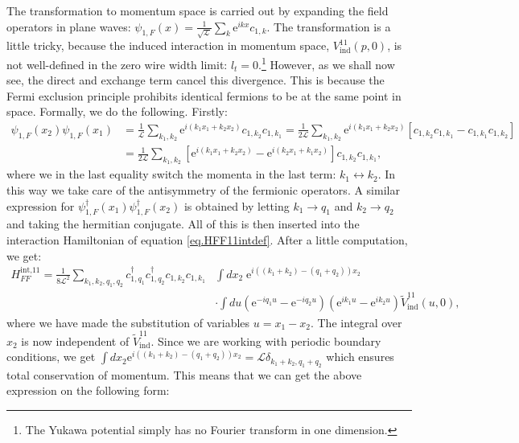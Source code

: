 The transformation to momentum space is carried out by expanding the field operators in plane waves: $\psi_{1,F}(x) = \frac{1}{\sqrt{\mathcal{L}}}\sum_k \text{e}^{ikx} c_{1,k}$. The transformation is a little tricky, because the induced interaction in momentum space, $V^{11}_{\text{ind}}(p, 0)$, is not well-defined in the zero wire width limit: $l_t = 0$.\footnote{The Yukawa potential simply has no Fourier transform in one dimension.} However, as we shall now see, the direct and exchange term cancel this divergence. This is because the Fermi exclusion principle prohibits identical fermions to be at the same point in space. Formally, we do the following. Firstly:
\begin{align}
\psi_{1,F}(x_2) \psi_{1,F}(x_1) &= \frac{1}{\mathcal{L}}\sum_{k_1,k_2} \text{e}^{i(k_1x_1 + k_2x_2)} c_{1, k_2}c_{1, k_1} = \frac{1}{2\mathcal{L}}\sum_{k_1,k_2} \text{e}^{i(k_1x_1 + k_2x_2)} \left[c_{1, k_2}c_{1, k_1} - c_{1, k_1}c_{1, k_2}\right] \nonumber \\
&= \frac{1}{2\mathcal{L}}\sum_{k_1,k_2} \left[\text{e}^{i(k_1x_1 + k_2x_2)} - \text{e}^{i(k_2x_1 + k_1x_2)}\right]c_{1, k_2}c_{1, k_1}, \nonumber
\end{align}
where we in the last equality switch the momenta in the last term: $k_1 \leftrightarrow k_2$. In this way we take care of the antisymmetry of the fermionic operators. A similar expression for $\psi^\dagger_{1, F}(x_1)\psi^\dagger_{1, F}(x_2)$ is obtained by letting $k_1 \to q_1$ and $k_2 \to q_2$ and taking the hermitian conjugate. All of this is then inserted into the interaction Hamiltonian of equation \eqref{eq.HFF11intdef}. After a little computation, we get:
\begin{align}
H^\text{int,11}_{FF} = \frac{1}{8\mathcal{L}^2} \sum_{k_1,k_2,q_1,q_2} c^\dagger_{1, q_1}c^\dagger_{1, q_2}c_{1, k_2}c_{1, k_1} & \int dx_2 \; \text{e}^{i((k_1 + k_2) -(q_1 + q_2))x_2} \nonumber \\ 
& \cdot \int du\left( \text{e}^{-iq_1u} - \text{e}^{-iq_2u} \right)\left( \text{e}^{ik_1u} - \text{e}^{ik_2u} \right)\tilde{V}^{11}_\text{ind}(u, 0), \nonumber
\end{align}
where we have made the substitution of variables $u = x_1 - x_2$. The integral over $x_2$ is now independent of $\tilde{V}^{11}_{\text{ind}}$. Since we are working with periodic boundary conditions, we get $\int dx_2 \text{e}^{i((k_1 + k_2) - (q_1 + q_2))x_2} = \mathcal{L}\delta_{k_1 + k_2, q_1 + q_2}$ which ensures total conservation of momentum. This means that we can get the above expression on the following form: 
